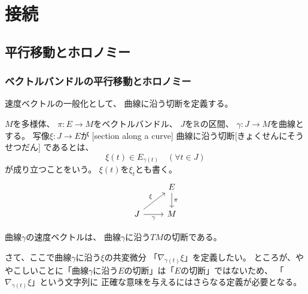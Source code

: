\documentclass[report]{jlreq}
\begin{document}
\tableofcontents
\markboth{\contentsname}{}

%
\newpage
\setcounter{chapter}{1}
\chapter{接続}

%
\setcounter{section}{7}
\section{平行移動とホロノミー}

\subsection{ベクトルバンドルの平行移動とホロノミー}

速度ベクトルの一般化として、
曲線に沿う切断を定義する。

\begin{definition}[曲線に沿う切断]
    $M$を多様体、
    $\pi \colon E \to M$をベクトルバンドル、
    $J$を$\mathbb{R}$の区間、
    $\gamma \colon J \to M$を{\smooth}曲線とする。
    {\smooth}写像$\xi \colon J \to E$が
    [section along a curve]
    {曲線に沿う切断}[きょくせんにそうせつだん]
    であるとは、
    \begin{equation}
        \xi(t) \in E_{\gamma(t)}
            \quad
            (\forall t \in J)
    \end{equation}
    が成り立つことをいう。
    $\xi(t)$を$\xi_t$とも書く。
    \begin{equation}
        \begin{tikzcd}
            & E \ar{d}{\pi} \\
            J \ar{ru}{\xi} \ar{r}[swap]{\gamma}
                & M
        \end{tikzcd}
    \end{equation}
\end{definition}

\begin{example}
    曲線$\gamma$の速度ベクトルは、
    曲線$\gamma$に沿う$TM$の切断である。
\end{example}

さて、ここで曲線$\gamma$に沿う$\xi$の共変微分
「$\nabla_{\dot{\gamma}(t)} \xi$」を定義したい。
ところが、ややこしいことに「曲線$\gamma$に沿う$E$の切断」は「$E$の切断」ではないため、
「$\nabla_{\dot{\gamma}(t)} \xi$」という文字列に
正確な意味を与えるにはさらなる定義が必要となる。
\end{document}
